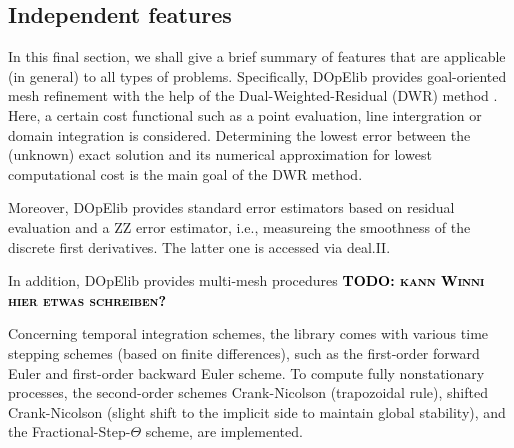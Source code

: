 \documentclass[prodmode,acmtoms]{acmsmall}
\numberwithin{equation}{section}
\newcommand{\todo}[1]{\textbf{\textsc{\textcolor{black}{TODO: #1}}}}
\begin{document}
\subsection{Independent features}
In this final section, we shall give a brief summary of features 
that are applicable (in general) to all types of problems. Specifically,
DOpElib provides goal-oriented mesh refinement with the help of the 
Dual-Weighted-Residual (DWR) method \cite{BeRa96}. Here, a certain 
cost functional such as a point evaluation, line intergration or domain
integration is considered. Determining the lowest error between the 
(unknown) exact solution and its numerical approximation for lowest computational
cost is the main goal of the DWR method.

Moreover, DOpElib provides standard error estimators based on residual evaluation and 
a ZZ error estimator, i.e., measureing the smoothness of the discrete first derivatives.
The latter one is accessed via deal.II. 

In addition, DOpElib provides multi-mesh procedures 
\todo{kann Winni hier etwas schreiben?}

Concerning temporal integration schemes, the library comes 
with various time stepping schemes (based on finite differences), 
such as the first-order forward Euler and first-order backward Euler scheme. 
To compute fully nonstationary processes, the second-order schemes
Crank-Nicolson (trapozoidal rule), 
shifted Crank-Nicolson (slight shift to the implicit side to maintain
global stability), 
and the Fractional-Step-$\Theta$ scheme, are implemented.
\end{document}
